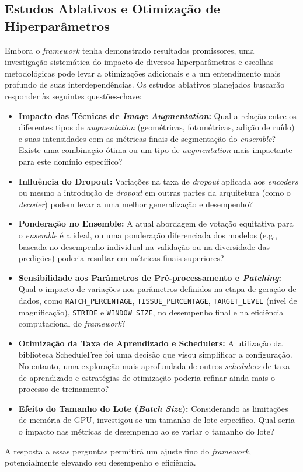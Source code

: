 \subsection{Estudos Ablativos e Otimização de Hiperparâmetros}\label{subsec:futuros_ablativos}
Embora o \textit{framework} tenha demonstrado resultados promissores, uma investigação sistemática do impacto de diversos hiperparâmetros e escolhas metodológicas pode levar a otimizações adicionais e a um entendimento mais profundo de suas interdependências. Os estudos ablativos planejados buscarão responder às seguintes questões-chave:
\begin{itemize}
    \item \textbf{Impacto das Técnicas de \textit{Image Augmentation}:} Qual a relação entre os diferentes tipos de \textit{augmentation} (geométricas, fotométricas, adição de ruído) e suas intensidades com as métricas finais de segmentação do \textit{ensemble}? Existe uma combinação ótima ou um tipo de \textit{augmentation} mais impactante para este domínio específico?
    \item \textbf{Influência do Dropout:} Variações na taxa de \textit{dropout} aplicada aos \textit{encoders} ou mesmo a introdução de \textit{dropout} em outras partes da arquitetura (como o \textit{decoder}) podem levar a uma melhor generalização e desempenho?
    \item \textbf{Ponderação no Ensemble:} A atual abordagem de votação equitativa para o \textit{ensemble} é a ideal, ou uma ponderação diferenciada dos modelos (e.g., baseada no desempenho individual na validação ou na diversidade das predições) poderia resultar em métricas finais superiores?
    \item \textbf{Sensibilidade aos Parâmetros de Pré-processamento e \textit{Patching}:} Qual o impacto de variações nos parâmetros definidos na etapa de geração de dados, como \texttt{MATCH\_PERCENTAGE}, \texttt{TISSUE\_PERCENTAGE}, \texttt{TARGET\_LEVEL} (nível de magnificação), \texttt{STRIDE} e \texttt{WINDOW\_SIZE}, no desempenho final e na eficiência computacional do \textit{framework}?
    \item \textbf{Otimização da Taxa de Aprendizado e Schedulers:} A utilização da biblioteca ScheduleFree foi uma decisão que visou simplificar a configuração. No entanto, uma exploração mais aprofundada de outros \textit{schedulers} de taxa de aprendizado e estratégias de otimização poderia refinar ainda mais o processo de treinamento?
    \item \textbf{Efeito do Tamanho do Lote (\textit{Batch Size}):} Considerando as limitações de memória de GPU, investigou-se um tamanho de lote específico. Qual seria o impacto nas métricas de desempenho ao se variar o tamanho do lote?
\end{itemize}
A resposta a essas perguntas permitirá um ajuste fino do \textit{framework}, potencialmente elevando seu desempenho e eficiência.

